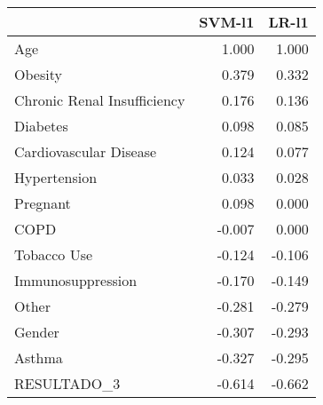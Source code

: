 \begin{tabular}{lrr}
\toprule
{} &  SVM-l1 &  LR-l1 \\
\midrule
Age                         &   1.000 &  1.000 \\
Obesity                     &   0.379 &  0.332 \\
Chronic Renal Insufficiency &   0.176 &  0.136 \\
Diabetes                    &   0.098 &  0.085 \\
Cardiovascular Disease      &   0.124 &  0.077 \\
Hypertension                &   0.033 &  0.028 \\
Pregnant                    &   0.098 &  0.000 \\
COPD                        &  -0.007 &  0.000 \\
Tobacco Use                 &  -0.124 & -0.106 \\
Immunosuppression           &  -0.170 & -0.149 \\
Other                       &  -0.281 & -0.279 \\
Gender                      &  -0.307 & -0.293 \\
Asthma                      &  -0.327 & -0.295 \\
RESULTADO\_3                 &  -0.614 & -0.662 \\
\bottomrule
\end{tabular}
